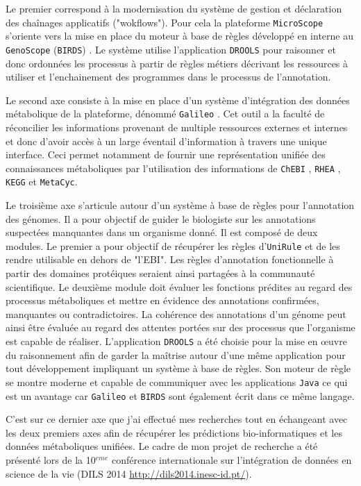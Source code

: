 \begin{refsegment}
Le premier  correspond à la modernisation du système de gestion et déclaration des chaînages applicatifs ("wokflows"). Pour cela la plateforme \texttt{MicroScope} s'oriente vers la mise en place du moteur à base de règles développé en interne au \texttt{GenoScope} (\texttt{\gls{BIRDS}}) . Le système utilise l'application \texttt{DROOLS}\cite{mcwhirter2001drools,browne2009jboss} pour raisonner et donc ordonnées les processus à partir de règles métiers décrivant les ressources à utiliser et l’enchainement des programmes dans le processus de l'annotation.

Le second axe consiste à la mise en place d'un système d'intégration des données métabolique de la plateforme, dénommé \texttt{Galileo} \cite{galileo2014}. Cet outil a la faculté de réconcilier les informations provenant de multiple ressources externes et internes et donc d'avoir accès à un large éventail d'information à travers une unique interface. Ceci permet  notamment de fournir une représentation unifiée des connaissances métaboliques par l'utilisation des informations de \texttt{ChEBI} \cite{hastings2013chebi}, \texttt{RHEA} \cite{alcantara2012rhea}, \texttt{KEGG} et \texttt{MetaCyc}.

Le troisième axe s'articule autour d'un système à base de règles pour l'annotation des génomes. Il a pour objectif de guider le biologiste sur les annotations suspectées manquantes dans un organisme donné. Il est composé de deux modules. Le premier a pour objectif de récupérer les règles d'\texttt{UniRule} et de les rendre utilisable en dehors de "l'\gls{EBI}". Les règles d'annotation fonctionnelle à partir des domaines protéiques seraient ainsi partagées à la communauté scientifique. Le deuxième module doit évaluer les fonctions prédites au regard des processus métaboliques et mettre en évidence des annotations confirmées,   manquantes ou contradictoires. La cohérence des annotations d'un génome peut ainsi être évaluée au regard des attentes portées sur des processus que l'organisme est capable de réaliser. L'application \texttt{DROOLS} a été choisie pour la mise en œuvre du raisonnement afin de garder la maîtrise autour d'une même application pour tout développement impliquant un système à base de règles. Son moteur de règle se montre moderne et capable de communiquer avec les applications \texttt{Java} ce  qui est un avantage car \texttt{Galileo} et \texttt{BIRDS} sont également écrit dans ce même langage.

C'est sur ce dernier axe que j'ai effectué mes recherches tout en échangeant avec les deux premiers axes afin de récupérer les prédictions bio-informatiques et les données métaboliques unifiées. Le cadre de mon projet de recherche a été présenté lors de la 10$^{eme}$ conférence internationale sur l'intégration de données en science de la vie (DILS 2014 \url{http://dils2014.inesc-id.pt/}).


\end{refsegment}
